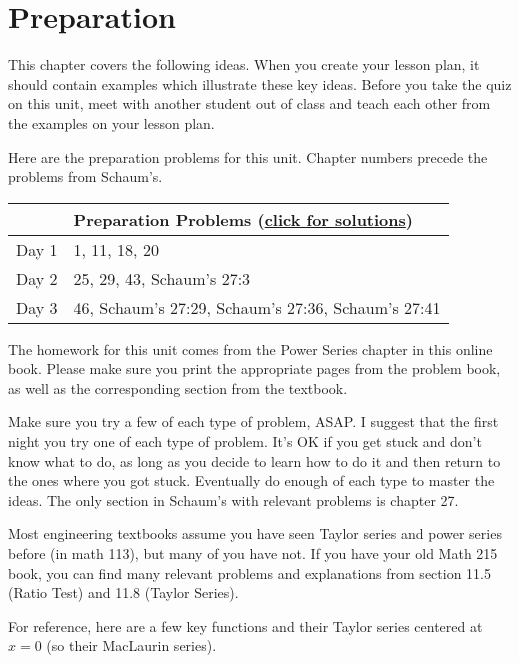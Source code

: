 
\section{Preparation}

\noindent  
This chapter covers the following ideas. When you create your lesson plan, it should contain examples which illustrate these key ideas. Before you take the quiz on this unit, meet with another student out of class and teach each other from the examples on your lesson plan. 



Here are the preparation problems for this unit. Chapter numbers precede the problems from Schaum's.
\begin{center}
\begin{tabular}{ll}
&Preparation Problems 
(\href{https://ilearn.byui.edu/bbcswebdav/institution/Physical\_Sci\_Eng/Mathematics/Personal\%20Folders/WoodruffB/316/08-Power-Series-Preparation-Solutions.pdf}{click for solutions})
\\
\hline\hline
Day 1& 1, 11, 18, 20
\\\hline
Day 2& 25, 29, 43, Schaum's 27:3
\\\hline
Day 3& 46, Schaum's 27:29, Schaum's 27:36, Schaum's 27:41
\\\hline
\end{tabular}
\end{center}


The homework for this unit comes from the Power Series chapter in this online book.  Please make sure you print the appropriate pages from the problem book, as well as the corresponding section from the textbook.  

Make sure you try a few of each type of problem, ASAP. I suggest that the first night you try one of each type of problem. It's OK if you get stuck and don't know what to do, as long as you decide to learn how to do it and then return to the ones where you got stuck. Eventually do enough of each type to master the ideas.  The only section in Schaum's with relevant problems is chapter 27.  

Most engineering textbooks assume you have seen Taylor series and power series before (in math 113), but many of you have not. If you have your old Math 215 book, you can find many relevant problems and explanations from section 11.5 (Ratio Test) and 11.8 (Taylor Series).  

For reference, here are a few key functions and their Taylor series centered at $x=0$ (so their MacLaurin series).

